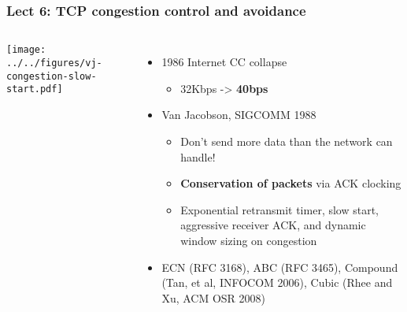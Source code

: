 \begin{frame}
  \frametitle{Lect 6: TCP congestion control and avoidance}

  \begin{columns}[T]
      \begin{center}
	\texttt{[image: ../../figures/vj-congestion-slow-start.pdf]}
      \end{center}


      \pause

      \begin{itemize}
	\item 1986 Internet CC collapse
	\begin{itemize}
	  \item 32Kbps -> \textbf{40bps}
	\end{itemize}

	\pause

	\item Van Jacobson, SIGCOMM 1988
	\begin{itemize}
	  \item Don't send more data than the network can handle!

	  \pause

	  \item \textbf{Conservation of packets} via ACK clocking

	  \pause

	  \item Exponential retransmit timer, slow start, aggressive receiver
	    ACK, and dynamic window sizing on congestion
        \end{itemize}

	\pause

        \item ECN (RFC 3168), ABC (RFC 3465), Compound (Tan, et al, INFOCOM
	  2006), Cubic (Rhee and Xu, ACM OSR 2008)
      \end{itemize}
  \end{columns}
\end{frame}

